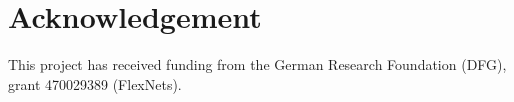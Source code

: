 \section{Acknowledgement}
This project has received funding from the German Research Foundation (DFG), grant 470029389 (FlexNets).